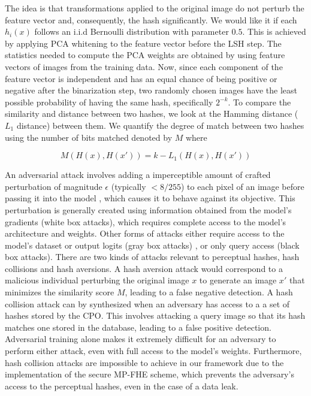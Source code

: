 The idea is that transformations applied to the original image do not perturb the feature vector and, consequently, the hash significantly. We would like it if each $h_i(x)$ follows an i.i.d Bernoulli distribution with parameter $0.5$. This is achieved by applying PCA whitening to the feature vector before the LSH step. The statistics needed to compute the PCA weights are obtained by using feature vectors of images from the training data. Now, since each component of the feature vector is independent and has an equal chance of being positive or negative after the binarization step, two randomly chosen images have the least possible probability of having the same hash, specifically $2^{-k}$. To compare the similarity and distance between two hashes, we look at the Hamming distance ($L_1$ distance) between them. We quantify the degree of match between two hashes using the number of bits matched denoted by $M$ where

\vspace{-0.4cm}
\[
M(H(x),H(x')) = k - L_1(H(x), H(x'))
\]
\vspace{-0.6cm}

An adversarial attack involves adding a imperceptible amount of crafted perturbation of magnitude $\epsilon$ (typically $<8/255$) to each pixel of an image before passing it into the model \cite{subtle_adversarial}, which causes it to behave against its objective. This perturbation is generally created using information obtained from the model's gradients (white box attacks), which requires complete access to the model's architecture and weights. Other forms of attacks either require access to the model's dataset or output logits (gray box attacks) \cite{papernot2016distillationdefenseadversarialperturbations, inversion_attack, invert}, or only query access (black box attacks). There are two kinds of attacks relevant to perceptual hashes, hash collisions and hash aversions. A hash aversion attack would correspond to a malicious individual perturbing the original image $x$ to generate an image $x'$ that minimizes the similarity score $M$, leading to a false negative detection. A hash collision attack can by synthesized when an adversary has access to a a set of hashes stored by the CPO. This involves attacking a query image so that its hash matches one stored in the database, leading to a false positive detection. Adversarial training alone makes it extremely difficult for an adversary to perform either attack, even with full access to the model's weights. Furthermore, hash collision attacks are impossible to achieve in our framework due to the implementation of the secure MP-FHE scheme, which prevents the adversary's access to the perceptual hashes, even in the case of a data leak.

